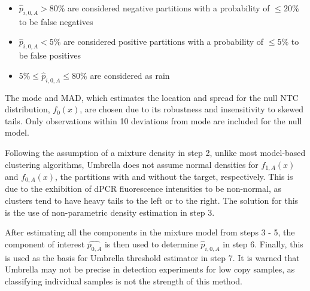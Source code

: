 \begin{enumerate}
    \begin{itemize}
        \item \(\hat{p}_{i,0,A} > 80\%\) are considered negative partitions with a probability of \(\leq20\%\) to be false negatives
        \item \(\hat{p}_{i,0,A} < 5\%\) are considered positive partitions with a probability of \(\leq5\%\) to be false positives
        \item \(5\% \leq \hat{p}_{i,0,A} \leq 80\%\) are considered as rain
    \end{itemize}
\end{enumerate}

The mode and MAD, which estimates the location and spread for the null NTC distribution, \(f_{0}(x)\), are chosen due to its robustness and insensitivity to skewed tails. Only observations within 10 deviations from mode are included for the null model.

Following the assumption of a mixture density in step 2, unlike most model-based clustering algorithms, Umbrella does not assume normal densities for \(f_{1,A}(x)\) and \(f_{0,A}(x)\), the partitions with and without the target, respectively. This is due to the exhibition of dPCR fluorescence intensities to be non-normal, as clusters tend to have heavy tails to the left or to the right. The solution for this is the use of non-parametric density estimation in step 3.

After estimating all the components in the mixture model from steps 3 - 5, the component of interest \(\hat{p_{0,A}}\) is then used to determine \(\hat{p}_{i,0,A}\) in step 6. Finally, this is used as the basis for Umbrella threshold estimator in step 7. It is warned that Umbrella may not be precise in detection experiments for low copy samples, as classifying individual samples is not the strength of this method.

